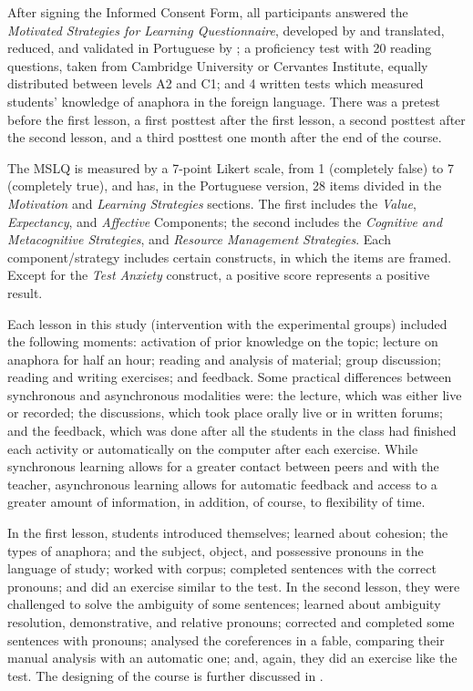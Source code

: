 \documentclass{textolivre}
\begin{document}
After signing the Informed Consent Form, all participants answered the
\emph{Motivated Strategies for Learning Questionnaire}, developed by
\textcite{pintrich_reliability_1993} and translated, reduced,
and validated in Portuguese by \textcite{mckeachie_2008}; a
proficiency test with 20 reading questions, taken from Cambridge
University or Cervantes Institute, equally distributed between levels A2
and C1; and 4 written tests which measured students' knowledge of
anaphora in the foreign language. There was a pretest before the first
lesson, a first posttest after the first lesson, a second posttest after
the second lesson, and a third posttest one month after the end of the
course.

The MSLQ is measured by a 7-point Likert scale, from 1 (completely
false) to 7 (completely true), and has, in the Portuguese version, 28
items divided in the \emph{Motivation} and \emph{Learning Strategies}
sections. The first includes the \emph{Value}, \emph{Expectancy}, and
\emph{Affective} Components; the second includes the \emph{Cognitive and
Metacognitive Strategies}, and \emph{Resource Management Strategies}.
Each component/strategy includes certain constructs, in which the items
are framed. Except for the \emph{Test Anxiety} construct, a positive
score represents a positive result.

Each lesson in this study (intervention
with the experimental groups) included the following moments: activation
of prior knowledge on the topic; lecture on anaphora for half an hour;
reading and analysis of material; group discussion; reading and writing
exercises; and feedback. Some practical differences between synchronous
and asynchronous modalities were: the lecture, which was either live or
recorded; the discussions, which took place orally live or in written
forums; and the feedback, which was done after all the students in the
class had finished each activity or automatically on the computer after
each exercise. While synchronous learning allows for a greater contact
between peers and with the teacher, asynchronous learning allows for
automatic feedback and access to a greater amount of information, in
addition, of course, to flexibility of time.

In the first lesson, students introduced themselves; learned about
cohesion; the types of anaphora; and the subject, object, and possessive
pronouns in the language of study; worked with corpus; completed
sentences with the correct pronouns; and did an exercise similar to the
test. In the second lesson, they were challenged to solve the ambiguity
of some sentences; learned about ambiguity resolution, demonstrative,
and relative pronouns; corrected and completed some sentences with
pronouns; analysed the coreferences in a fable, comparing their manual
analysis with an automatic one; and, again, they did an exercise like
the test. The designing of the course is further discussed in \textcite{bruscato_designing_2021}.
\end{document}
